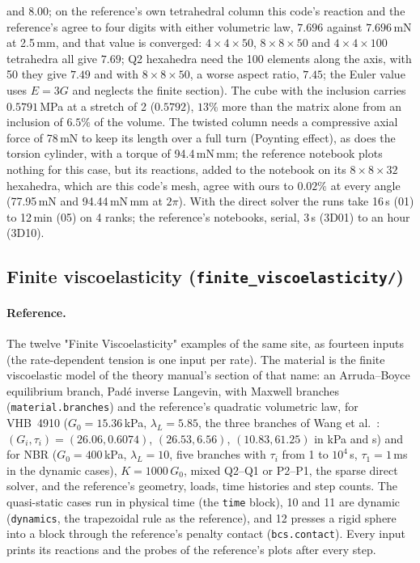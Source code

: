 \documentclass[11pt]{article}
\DeclareRobustCommand{\code}[1]{{\def\_{\textunderscore\allowbreak}\texttt{#1}}}
\begin{document}
and 8.00; on the reference's own tetrahedral column this code's reaction and
the reference's agree to four digits with either volumetric law, $7.696$
against $7.696$\,mN at 2.5\,mm, and that value is converged: $4\times4\times50$,
$8\times8\times50$ and $4\times4\times100$ tetrahedra all give $7.69$; Q2
hexahedra need the 100 elements along the axis, with 50 they give $7.49$ and
with $8\times8\times50$, a worse aspect ratio, $7.45$; the Euler value uses
$E = 3G$ and neglects the finite section).  The cube with the inclusion carries
$0.5791$\,MPa at a stretch of 2 ($0.5792$), $13\%$ more than the matrix
alone from an inclusion of $6.5\%$ of the volume.  The twisted column needs
a compressive axial force of 78\,mN to keep its length over a full turn
(Poynting effect), as does the torsion cylinder, with a torque of
94.4\,mN\,mm; the reference notebook plots nothing for this case, but its
reactions, added to the notebook on its $8\times8\times32$ hexahedra, which
are this code's mesh, agree with ours to $0.02\%$ at every angle
(77.95\,mN and 94.44\,mN\,mm at $2\pi$).  With the direct solver
the runs take 16\,s (01) to 12\,min (05) on 4 ranks; the reference's
notebooks, serial, 3\,s (3D01) to an hour (3D10).

\subsection{Finite viscoelasticity (\texttt{finite\_viscoelasticity/})}
\label{sec:anandvisco}

\paragraph{Reference.}
The twelve "Finite Viscoelasticity" examples of the same site, as fourteen
inputs (the rate-dependent tension is one input per rate).  The material is
the finite viscoelastic model of the theory manual's section of that name:
an Arruda--Boyce equilibrium branch, Pad\'e inverse Langevin, with Maxwell
branches (\code{material.branches}) and the reference's quadratic
volumetric law, for VHB~4910 ($G_0 = 15.36$\,kPa, $\lambda_L = 5.85$, the
three branches of Wang et al.\ \cite{wang2016}: $(G_i, \tau_i) = (26.06, 0.6074)$,
$(26.53, 6.56)$, $(10.83, 61.25)$ in kPa and s) and for NBR
($G_0 = 400$\,kPa, $\lambda_L = 10$, five branches with $\tau_i$ from 1 to
$10^4$\,s, $\tau_1 = 1$\,ms in the dynamic cases), $K = 1000\,G_0$, mixed
Q2--Q1 or P2--P1, the sparse direct solver, and the reference's geometry,
loads, time histories and step counts.  The quasi-static cases run in
physical time (the \code{time} block), 10 and 11 are dynamic
(\code{dynamics}, the trapezoidal rule as the reference), and 12 presses a
rigid sphere into a block through the reference's penalty contact
(\code{bcs.contact}).  Every input prints its reactions and the probes of
the reference's plots after every step.
\end{document}
